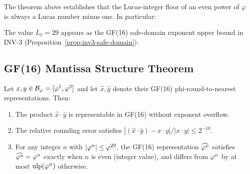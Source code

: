 \begin{remark}
The theorem above establishes that the Lucas-integer floor of an even
power of \(\varphi\) is always a Lucas number minus one.  In
particular:
\begin{center}
\end{center}
The value \(L_7 = 29\) appears as the GF(16) safe-domain exponent
upper bound in INV-3 (Proposition~\ref{prop:inv3-safe-domain}).
\end{remark}

\subsection{GF(16) Mantissa Structure Theorem}
\label{ssec:gf16-mantissa-thm}

\begin{theorem}\label{thm:gf16-closure}
  Let \(x, y \in \mathcal{B}_\varphi = [\varphi^{1}, \varphi^{2}]\)
  and let \(\hat x, \hat y\) denote their GF(16) phi-round-to-nearest
  representations.  Then:
  \begin{enumerate}
    \item[\textup{(a)}] The product \(\hat x \cdot \hat y\) is
      representable in GF(16) without exponent overflow.
    \item[\textup{(b)}] The relative rounding error satisfies
      \(|(\hat x \cdot \hat y) - x \cdot y| / |x \cdot y| \leq
      2^{-10}\).
    \item[\textup{(c)}] For any integer \(n\) with
      \(|\varphi^{n}| \leq \varphi^{29}\),  the GF(16) representation
      \(\widehat{\varphi^{n}}\) satisfies \(\widehat{\varphi^{n}} =
      \varphi^{n}\) exactly when \(n\) is even (integer value), and
      differs from \(\varphi^{n}\) by at most \(\mathrm{ulp}(
      \varphi^{n})\) otherwise.
  \end{enumerate}
\end{theorem}

